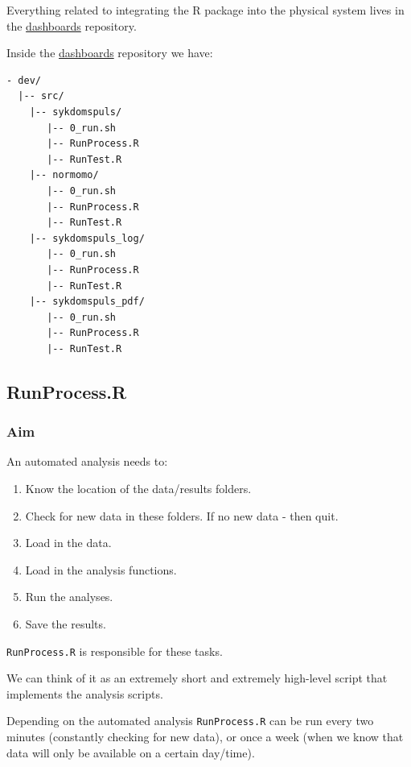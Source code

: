 \documentclass[12pt,]{article}
\providecommand{\tightlist}{%
  \setlength{\itemsep}{0pt}\setlength{\parskip}{0pt}}
\theoremstyle{definition}
\theoremstyle{definition}
\theoremstyle{definition}
\theoremstyle{remark}
\begin{document}
Everything related to integrating the R package into the physical system
lives in the
\href{https://github.com/folkehelseinstituttet/dashboards/}{dashboards}
repository.

Inside the
\href{https://github.com/folkehelseinstituttet/dashboards/}{dashboards}
repository we have:

\begin{verbatim}
- dev/
  |-- src/
    |-- sykdomspuls/
       |-- 0_run.sh
       |-- RunProcess.R
       |-- RunTest.R
    |-- normomo/
       |-- 0_run.sh
       |-- RunProcess.R
       |-- RunTest.R
    |-- sykdomspuls_log/
       |-- 0_run.sh
       |-- RunProcess.R
       |-- RunTest.R
    |-- sykdomspuls_pdf/
       |-- 0_run.sh
       |-- RunProcess.R
       |-- RunTest.R
\end{verbatim}

\subsection{RunProcess.R}\label{runprocess.r}

\subsubsection{Aim}\label{aim}

An automated analysis needs to:

\begin{enumerate}
\def\labelenumi{\arabic{enumi}.}
\tightlist
\item
  Know the location of the data/results folders.
\item
  Check for new data in these folders. If no new data - then quit.
\item
  Load in the data.
\item
  Load in the analysis functions.
\item
  Run the analyses.
\item
  Save the results.
\end{enumerate}

\texttt{RunProcess.R} is responsible for these tasks.

We can think of it as an extremely short and extremely high-level script
that implements the analysis scripts.

Depending on the automated analysis \texttt{RunProcess.R} can be run
every two minutes (constantly checking for new data), or once a week
(when we know that data will only be available on a certain day/time).
\end{document}
